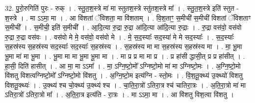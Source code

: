 \documentclass[17pt]{extarticle}
\begin{document}
32. पु॒रो॒रुगिति॑ पुरः - रुक् । . स्तु॒त॒श॒स्त्रे मा॑ मा स्तुतश॒स्त्रे स्तु॑तश॒स्त्रे मा᳚ । . स्तु॒त॒श॒स्त्रे इति॑ स्तुत - श॒स्त्रे । . मा ऽऽमा॒ मा । . आ वि॑शतां ॅविशता॒ मा वि॑शताम् । . वि॒श॒ताꣳ॒॒ स॒मीची॑ स॒मीची॑ विशतां ॅविशताꣳ स॒मीची᳚ । . स॒मीची॒ इति॑ स॒मीची᳚ । . आ॒दि॒त्या रु॒द्रा रु॒द्रा आ॑दि॒त्या आ॑दि॒त्या रु॒द्राः । . रु॒द्रा वस॑वो॒ वस॑वो रु॒द्रा रु॒द्रा वस॑वः । . वस॑वो मे मे॒ वस॑वो॒ वस॑वो मे । . मे॒ स॒द॒स्याः᳚ सद॒स्या॑ मे मे सद॒स्याः᳚ । . स॒द॒स्याः᳚ स॒हस्र॑स्य स॒हस्र॑स्य सद॒स्याः᳚ सद॒स्याः᳚ स॒हस्र॑स्य । . स॒हस्र॑स्य मा मा स॒हस्र॑स्य स॒हस्र॑स्य मा । . मा॒ भू॒मा भू॒मा मा॑ मा भू॒मा । . भू॒मा मा मा भू॒मा भू॒मा मा । . मा प्र प्र मा मा प्र । . प्र हा॑सी द्धासी॒त् प्र प्र हा॑सीत् । . हा॒सी॒ दिति॑ हासीत् । . आ मा॒ मा ऽऽमा᳚ । . मा॒ ऽग्नि॒ष्टो॒मो᳚ ऽग्निष्टो॒मो मा॑ मा ऽग्निष्टो॒मः । . अ॒ग्नि॒ष्टो॒मो वि॑शतु विशत्वग्निष्टो॒मो᳚ ऽग्निष्टो॒मो वि॑शतु । . अ॒ग्नि॒ष्टो॒म इत्य॑ग्नि - स्तो॒मः । . वि॒श॒तू॒क्थ्य॑ उ॒क्थ्यो॑ विशतु विशतू॒क्थ्यः॑ । . उ॒क्थ्य॑ श्च चो॒क्थ्य॑ उ॒क्थ्य॑ श्च । . चा॒ति॒रा॒त्रो॑ ऽतिरा॒त्र श्च॑ चातिरा॒त्रः । . अ॒ति॒रा॒त्रो मा॑ मा ऽतिरा॒त्रो॑ ऽतिरा॒त्रो मा᳚ । . अ॒ति॒रा॒त्र इत्य॑ति - रा॒त्रः । . मा ऽऽमा॒ मा । . आ वि॑शतु विश॒त्वा वि॑शतु । \newline
\end{document}
